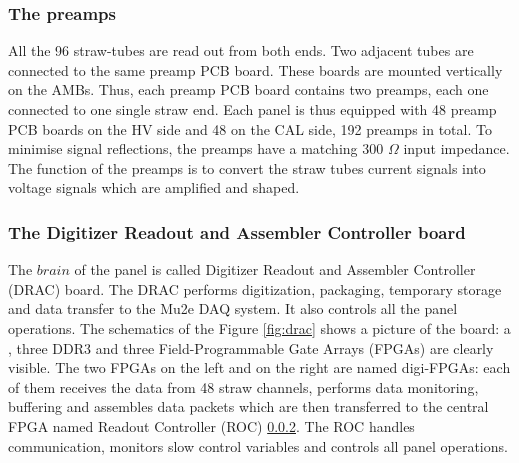 \subsubsection{The preamps}\label{preampss}
All the 96 straw-tubes are read out from both ends. 
Two adjacent tubes are connected to the same preamp PCB board. 
These boards are mounted vertically on the AMBs. 
Thus, each preamp PCB board contains two preamps,  
each one connected to one single straw end. 
Each panel is thus equipped with 48 preamp PCB boards on the HV 
side and 48 on the CAL side, 192 preamps in total.
To minimise signal reflections, the preamps have a matching 300 $\Omega$ input impedance. 
The function of the preamps is to convert the straw tubes 
current signals into voltage signals which are amplified and shaped. 
%
\subsubsection{The Digitizer Readout and Assembler Controller board}\label{DRAC}
The $brain$ of the panel is called Digitizer Readout and Assembler Controller (DRAC) board. 
The DRAC performs digitization, packaging, temporary storage and data transfer to 
the Mu2e DAQ system. It also controls all the panel operations. The schematics of the 
Figure \ref{fig:drac} shows a picture of the board: a , three DDR3  and three Field-Programmable Gate Arrays (FPGAs) 
are clearly visible. 
The two FPGAs on the left and on the right are named digi-FPGAs: 
each of them receives the data from 48 straw channels, performs data 
monitoring, buffering and assembles data packets which are then 
transferred to the central FPGA named Readout Controller (ROC) \ref{DRAC}. 
The ROC handles communication, monitors slow control variables and 
controls all panel operations.


